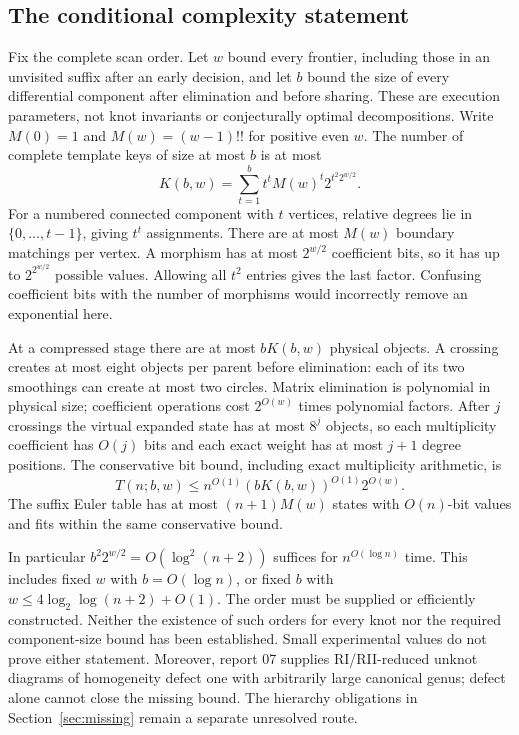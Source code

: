 \subsection{The conditional complexity statement}
Fix the complete scan order. Let $w$ bound every frontier, including those
in an unvisited suffix after an early decision, and let $b$ bound the size
of every differential component after elimination and before sharing.
These are execution parameters, not knot invariants or conjecturally
optimal decompositions. Write $M(0)=1$ and $M(w)=(w-1)!!$ for positive even
$w$. The number of complete template keys of size at most $b$ is at most
\[
 K(b,w)=\sum_{t=1}^{b}t^t M(w)^t 2^{t^2 2^{w/2}}.
\]
For a numbered connected component with $t$ vertices, relative degrees
lie in $\{0,\ldots,t-1\}$, giving $t^t$ assignments. There are at most
$M(w)$ boundary matchings per vertex. A morphism has at most $2^{w/2}$
coefficient bits, so it has up to $2^{2^{w/2}}$ possible values. Allowing
all $t^2$ entries gives the last factor. Confusing coefficient bits with
the number of morphisms would incorrectly remove an exponential here.

At a compressed stage there are at most $bK(b,w)$ physical objects. A
crossing creates at most eight objects per parent before elimination:
each of its two smoothings can create at most two circles. Matrix
elimination is polynomial in physical size; coefficient operations cost
$2^{O(w)}$ times polynomial factors. After $j$ crossings the virtual
expanded state has at most $8^j$ objects, so each multiplicity coefficient
has $O(j)$ bits and each exact weight has at most $j+1$ degree positions.
The conservative bit bound, including exact multiplicity arithmetic, is
\[
 T(n;b,w)\le n^{O(1)}(bK(b,w))^{O(1)}2^{O(w)}.
\]
The suffix Euler table has at most $(n+1)M(w)$ states with $O(n)$-bit
values and fits within the same conservative bound.

In particular $b^2 2^{w/2}=O(\log^2(n+2))$ suffices for
$n^{O(\log n)}$ time. This includes fixed $w$ with $b=O(\log n)$, or
fixed $b$ with $w\le4\log_2\log(n+2)+O(1)$. The order must be supplied
or efficiently constructed. Neither the existence of such orders for
every knot nor the required component-size bound has been established.
Small experimental values do not prove either statement. Moreover,
report 07 supplies RI/RII-reduced unknot diagrams of homogeneity defect
one with arbitrarily large canonical genus; defect alone cannot close
the missing bound. The hierarchy obligations in Section~\ref{sec:missing}
remain a separate unresolved route.


